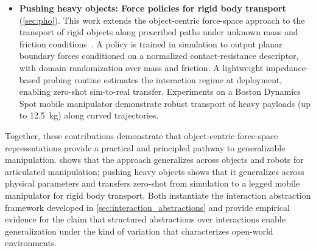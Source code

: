 {\begin{itemize}[leftmargin=*]
\item \textbf{Pushing heavy objects: Force policies for rigid body transport} (\cref{sec:pho}). This work extends the object-centric force-space approach to the transport of rigid objects along prescribed paths under unknown mass and friction conditions~\citep{goel2025pho}. A policy is trained in simulation to output planar boundary forces conditioned on a normalized contact-resistance descriptor, with domain randomization over mass and friction. A lightweight impedance-based probing routine estimates the interaction regime at deployment, enabling zero-shot sim-to-real transfer. Experiments on a Boston Dynamics Spot mobile manipulator demonstrate robust transport of heavy payloads (up to 12.5~kg) along curved trajectories.
\end{itemize}

Together, these contributions demonstrate that object-centric force-space representations provide a practical and principled pathway to generalizable manipulation. \FLEX{} shows that the approach generalizes across objects and robots for articulated manipulation; pushing heavy objects shows that it generalizes across physical parameters and transfers zero-shot from simulation to a legged mobile manipulator for rigid body transport. Both instantiate the interaction abstraction framework developed in \cref{sec:interaction_abstractions} and provide empirical evidence for the claim that structured abstractions over interactions enable generalization under the kind of variation that characterizes open-world environments.}
